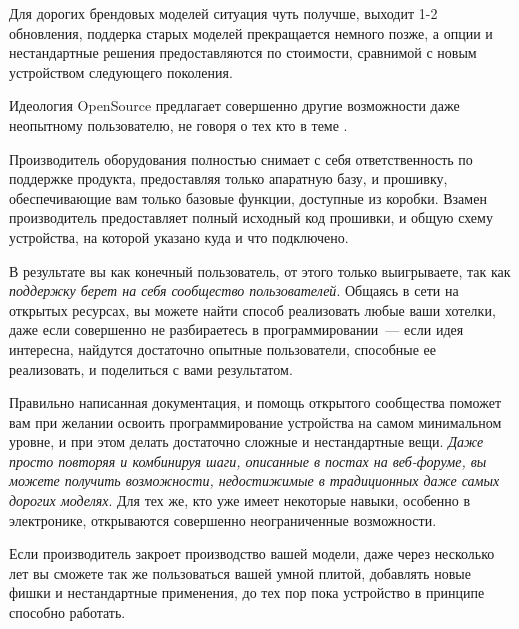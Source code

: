\noindent
Для дорогих брендовых моделей ситуация чуть получше, выходит 1-2 обновления,
поддерка старых моделей прекращается немного позже, а опции и нестандартные
решения предоставляются по стоимости, сравнимой с новым устройством следующего
поколения.

\clearpage
{}

Идеология OpenSource предлагает совершенно другие возможности даже неопытному
пользователю, не говоря о тех кто в теме .

Производитель оборудования полностью снимает с себя ответственность по
поддержке продукта, предоставляя только апаратную базу, и прошивку,
обеспечивающие вам только базовые функции, доступные из коробки. Взамен
производитель предоставляет полный исходный код прошивки, и общую схему
устройства, на которой указано куда и что подключено.

В результате вы как конечный пользователь, от этого только выигрываете, так как
\emph{поддержку берет на себя сообщество пользователей}. Общаясь в сети на
открытых ресурсах, вы можете найти
способ реализовать любые ваши хотелки, даже если совершенно не разбираетесь в
программировании\ --- если идея интересна, найдутся достаточно опытные
пользователи, способные ее реализовать, и поделиться с вами результатом.

Правильно написанная документация, и помощь открытого сообщества поможет вам при
желании освоить программирование устройства на самом минимальном уровне, и при
этом делать достаточно сложные и нестандартные вещи. \emph{Даже просто повторяя
и комбинируя шаги, описанные в постах на веб-форуме, вы можете получить
возможности, недостижимые в традиционных даже самых дорогих моделях}. Для тех
же, кто уже имеет некоторые навыки, особенно в электронике, открываются
совершенно неограниченные возможности.

Если производитель закроет производство вашей модели, даже через несколько лет
вы сможете так же пользоваться вашей умной плитой, добавлять новые фишки и
нестандартные применения, до тех пор пока устройство в принципе способно
работать.

